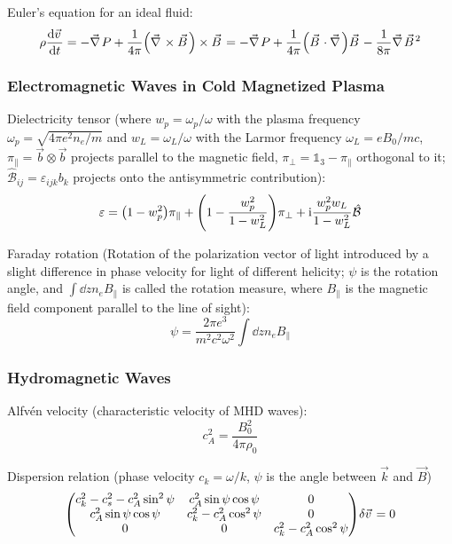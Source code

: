 			\noindent
			Euler's equation for an ideal fluid:
			\begin{equation}
				\rho \dv{\vec{v}}{t} = - \Nabla P + \frac{1}{4\pi}\qty(\Nabla\times\vec{B})\times\vec{B}
				= - \Nabla P + \frac{1}{4\pi} \qty(\vec{B} \cdot \Nabla) \vec{B} - \frac{1}{8\pi} \Nabla \vec{B}^2
			\end{equation}

		\subsubsection{Electromagnetic Waves in Cold Magnetized Plasma}
			Dielectricity tensor (where $w_p = \omega_p / \omega$ with the plasma frequency $\omega_p = \sqrt{4\pi e^2 n_e/m}$ and $w_L = \omega_L / \omega$ with the Larmor frequency $\omega_L = e B_0/mc$, $\pi_\parallel = \vec{b}\otimes\vec{b}$ projects parallel to the magnetic field, $\pi_\perp = \mathds{1}_3 - \pi_\parallel$ orthogonal to it; $\hat{\mathcal{B}}_{ij} = \varepsilon_{ijk} b_k$ projects onto the antisymmetric contribution):
			\begin{equation}
				\varepsilon = \qty(1 - w_p^2) \pi_\parallel + \qty(1-\frac{w_p^2}{1-w_L^2})\pi_\perp + \mathrm{i} \frac{w_p^2 w_L}{1-w_L^2} \hat{\mathcal{B}}
			\end{equation}

			\noindent
			Faraday rotation (Rotation of the polarization vector of light introduced by a slight difference in phase velocity for light of different helicity; $\psi$ is the rotation angle, and $\int \dd{z} n_e B_\parallel$ is called the rotation measure, where $B_\parallel$ is the magnetic field component parallel to the line of sight):
			\begin{equation}
				\psi = \frac{2\pi e^3}{m^2 c^2 \omega^2} \int \dd{z} n_e B_\parallel
			\end{equation}

		\subsubsection{Hydromagnetic Waves}
			Alfvén velocity (characteristic velocity of MHD waves):
			\begin{equation}
				c_A^2 = \frac{B_0^2}{4\pi \rho_0}
			\end{equation}

			\noindent
			Dispersion relation (phase velocity $c_k = \omega/k$, $\psi$ is the angle between $\vec{k}$ and $\vec{B}$)
			\begin{equation}
				\mqty(
				c_k^2 - c_s^2 - c_A^2 \sin^2 \psi & c_A^2 \sin\psi \cos\psi & 0 \\
				c_A^2 \sin\psi \cos\psi & c_k^2 - c_A^2 \cos^2 \psi & 0 \\
				0 & 0 & c_k^2 - c_A^2 \cos^2 \psi
				) \delta \vec{v} = 0
			\end{equation}

